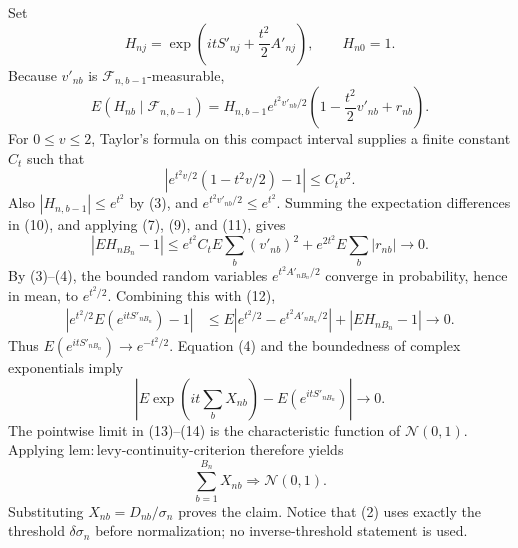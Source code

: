 Set
\[
H_{nj}=\exp\!\left(itS'_{nj}+\frac{t^2}{2}A'_{nj}\right),
\qquad H_{n0}=1.
\]
Because \(v'_{nb}\) is \(\mathcal F_{n,b-1}\)-measurable,
\[
E(H_{nb}\mid\mathcal F_{n,b-1})
=H_{n,b-1}e^{t^2v'_{nb}/2}
\left(1-\frac{t^2}{2}v'_{nb}+r_{nb}\right).
\tag{10}
\]
For \(0\le v\le2\), Taylor's formula on this compact interval supplies a finite constant \(C_t\) such that
\[
\left|e^{t^2v/2}(1-t^2v/2)-1\right|\le C_tv^2.
\tag{11}
\]
Also \(|H_{n,b-1}|\le e^{t^2}\) by (3), and \(e^{t^2v'_{nb}/2}\le e^{t^2}\). Summing the expectation differences in (10), and applying (7), (9), and (11), gives
\[
|EH_{nB_n}-1|
\le e^{t^2}C_tE\sum_b(v'_{nb})^2
+e^{2t^2}E\sum_b|r_{nb}|
\longrightarrow0.
\tag{12}
\]
By (3)--(4), the bounded random variables \(e^{t^2A'_{nB_n}/2}\) converge in probability, hence in mean, to \(e^{t^2/2}\). Combining this with (12),
\[
\begin{aligned}
\left|e^{t^2/2}E(e^{itS'_{nB_n}})-1\right|
&\le E\left|e^{t^2/2}-e^{t^2A'_{nB_n}/2}\right|
+|EH_{nB_n}-1|\longrightarrow0.
\end{aligned}
\tag{13}
\]
Thus \(E(e^{itS'_{nB_n}})\to e^{-t^2/2}\). Equation (4) and the boundedness of complex exponentials imply
\[
\left|E\exp\!\left(it\sum_bX_{nb}\right)-E(e^{itS'_{nB_n}})\right|\longrightarrow0.
\tag{14}
\]
The pointwise limit in (13)--(14) is the characteristic function of \(\mathcal N(0,1)\). Applying \(\mathrm{lem:levy\text{-}continuity\text{-}criterion}\) therefore yields
\[
\sum_{b=1}^{B_n}X_{nb}\Rightarrow\mathcal N(0,1).
\]
Substituting \(X_{nb}=D_{nb}/\sigma_n\) proves the claim. Notice that (2) uses exactly the threshold \(\delta\sigma_n\) before normalization; no inverse-threshold statement is used.